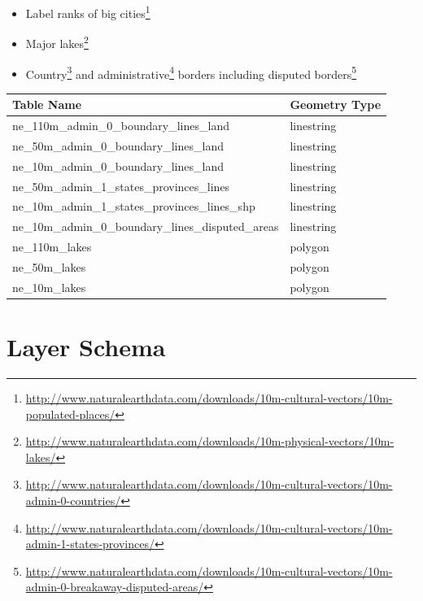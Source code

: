 \begin{itemize}
\item Label ranks of big cities\footnote{\url{http://www.naturalearthdata.com/downloads/10m-cultural-vectors/10m-populated-places/}}
\item Major lakes\footnote{\url{http://www.naturalearthdata.com/downloads/10m-physical-vectors/10m-lakes/}}
\item Country\footnote{\url{http://www.naturalearthdata.com/downloads/10m-cultural-vectors/10m-admin-0-countries/}} and administrative\footnote{\url{http://www.naturalearthdata.com/downloads/10m-cultural-vectors/10m-admin-1-states-provinces/}} borders including disputed borders\footnote{\url{http://www.naturalearthdata.com/downloads/10m-cultural-vectors/10m-admin-0-breakaway-disputed-areas/}}
\end{itemize}



\begin{flushleft}
    \begin{tabular}{ll}
    \hline
    Table Name                                          & Geometry Type \\
    \hline
    ne\_110m\_admin\_0\_boundary\_lines\_land           & linestring    \\
    ne\_50m\_admin\_0\_boundary\_lines\_land            & linestring    \\
    ne\_10m\_admin\_0\_boundary\_lines\_land            & linestring    \\
    ne\_50m\_admin\_1\_states\_provinces\_lines         & linestring    \\
    ne\_10m\_admin\_1\_states\_provinces\_lines\_shp    & linestring    \\
    ne\_10m\_admin\_0\_boundary\_lines\_disputed\_areas & linestring    \\
    ne\_110m\_lakes                                     & polygon       \\
    ne\_50m\_lakes                                      & polygon       \\
    ne\_10m\_lakes                                      & polygon       \\
    \end{tabular}
\end{flushleft}

\newpage
\section{Layer Schema}\label{layer-schema}

